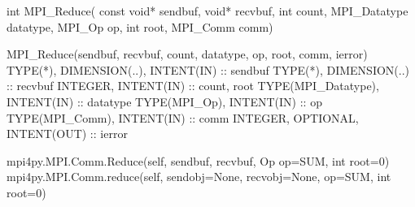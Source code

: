 int MPI_Reduce(
    const void* sendbuf, void* recvbuf, int count, MPI_Datatype datatype,
    MPI_Op op, int root, MPI_Comm comm)

MPI_Reduce(sendbuf, recvbuf, count, datatype, op, root, comm, ierror)
TYPE(*), DIMENSION(..), INTENT(IN) :: sendbuf
TYPE(*), DIMENSION(..) :: recvbuf
INTEGER, INTENT(IN) :: count, root
TYPE(MPI_Datatype), INTENT(IN) :: datatype
TYPE(MPI_Op), INTENT(IN) :: op
TYPE(MPI_Comm), INTENT(IN) :: comm
INTEGER, OPTIONAL, INTENT(OUT) :: ierror

mpi4py.MPI.Comm.Reduce(self, sendbuf, recvbuf, Op op=SUM, int root=0)
mpi4py.MPI.Comm.reduce(self, sendobj=None, recvobj=None, op=SUM, int root=0)

